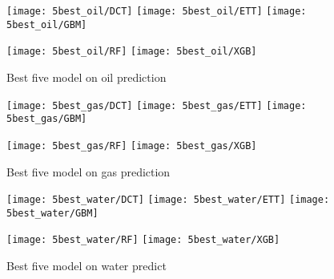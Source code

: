 \documentclass[english]{article}
\makeatletter
\def\maxwidth{\ifdim\Gin@nat@width>\linewidth\linewidth
    \else\Gin@nat@width\fi}
\let\Oldincludegraphics\includegraphics
\renewcommand{\includegraphics}[1]{\Oldincludegraphics[width=.8\maxwidth]{#1}}
\makeatother
\begin{document}
\begin{appendices}
\begin{figure}[H]
\centering
\texttt{[image: 5best\_oil/DCT]}\quad
\texttt{[image: 5best\_oil/ETT]}\quad
\texttt{[image: 5best\_oil/GBM]}

\medskip

\texttt{[image: 5best\_oil/RF]}\quad
\texttt{[image: 5best\_oil/XGB]}

\caption{Best five  model on oil prediction}
\label{pics:blablabla}
\end{figure}

\begin{figure}[H]
\centering
\texttt{[image: 5best\_gas/DCT]}\quad
\texttt{[image: 5best\_gas/ETT]}\quad
\texttt{[image: 5best\_gas/GBM]}

\medskip

\texttt{[image: 5best\_gas/RF]}\quad
\texttt{[image: 5best\_gas/XGB]}

\caption{Best five model on gas prediction}
\label{pics:blablabla}
\end{figure}
\begin{figure}[H]
\centering
\texttt{[image: 5best\_water/DCT]}\quad
\texttt{[image: 5best\_water/ETT]}\quad
\texttt{[image: 5best\_water/GBM]}

\medskip

\texttt{[image: 5best\_water/RF]}\quad
\texttt{[image: 5best\_water/XGB]}

\caption{Best five model on water predict}
\label{pics:blablabla}
\end{figure}
\begin{figure}[H]
     \begin{center}
%
        \\ %


\end{center}
\end{figure}
\end{appendices}
\end{document}

